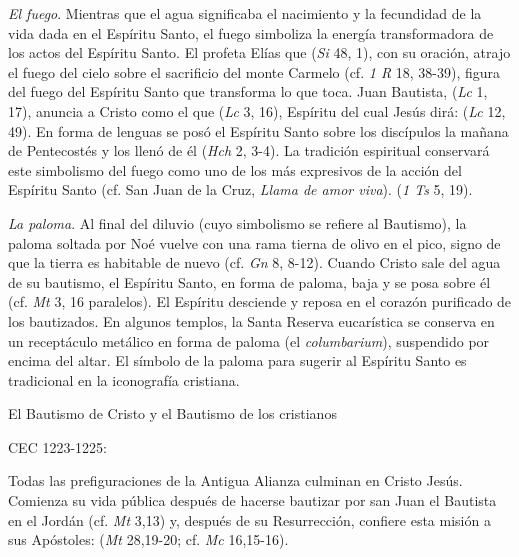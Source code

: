 	 \emph{El fuego}. Mientras que el agua significaba el nacimiento y la fecundidad de la vida dada en el Espíritu Santo, el fuego simboliza la energía transformadora de los actos del Espíritu Santo. El profeta Elías que  (\emph{Si} 48, 1), con su oración, atrajo el fuego del cielo sobre el sacrificio del monte Carmelo (cf. \emph{1 R} 18, 38-39), figura del fuego del Espíritu Santo que transforma lo que toca. Juan Bautista,  (\emph{Lc} 1, 17), anuncia a Cristo como el que  (\emph{Lc} 3, 16), Espíritu del cual Jesús dirá:  (\emph{Lc} 12, 49). En forma de lenguas  se posó el Espíritu Santo sobre los discípulos la mañana de Pentecostés y los llenó de él (\emph{Hch} 2, 3-4). La tradición espiritual conservará este simbolismo del fuego como uno de los más expresivos de la acción del Espíritu Santo (cf. San Juan de la Cruz, \emph{Llama de amor viva}).  (\emph{1 Ts} 5, 19).
	
	 \emph{La paloma}. Al final del diluvio (cuyo simbolismo se refiere al Bautismo), la paloma soltada por Noé vuelve con una rama tierna de olivo en el pico, signo de que la tierra es habitable de nuevo (cf. \emph{Gn} 8, 8-12). Cuando Cristo sale del agua de su bautismo, el Espíritu Santo, en forma de paloma, baja y se posa sobre él (cf. \emph{Mt} 3, 16 paralelos). El Espíritu desciende y reposa en el corazón purificado de los bautizados. En algunos templos, la Santa Reserva eucarística se conserva en un receptáculo metálico en forma de paloma (el \emph{columbarium}), suspendido por encima del altar. El símbolo de la paloma para sugerir al Espíritu Santo es tradicional en la iconografía cristiana.
	
	El Bautismo de Cristo y el Bautismo de los cristianos
	
	CEC 1223-1225:
	
	 Todas las prefiguraciones de la Antigua Alianza culminan en Cristo Jesús. Comienza su vida pública después de hacerse bautizar por san Juan el Bautista en el Jordán (cf. \emph{Mt} 3,13) y, después de su Resurrección, confiere esta misión a sus Apóstoles:  (\emph{Mt} 28,19-20; cf. \emph{Mc} 16,15-16).
	
